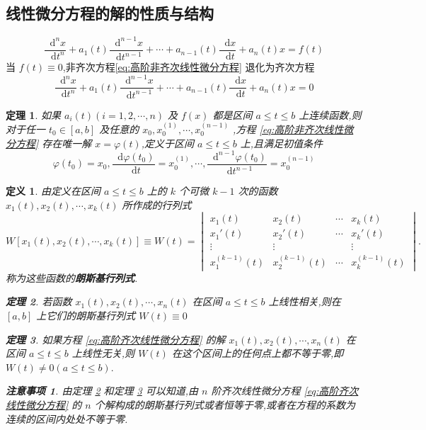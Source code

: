 \documentclass{ctexart}
\newtheorem{attention}{注意事项}
\newtheorem{definition}{定义}[section]
\newtheorem{theorem}{定理}[section]
\newcommand*{\dif}{\mathop{}\!\mathrm{d}}
\numberwithin{equation}{subsection}
\begin{document}
\subsection{线性微分方程的解的性质与结构}
\label{section:线性微分方程的解的性质与结构}
\begin{equation}
        \label{eq:高阶非齐次线性微分方程}
        \frac{\dif^nx}{\dif t^n}+a_1(t)\frac{\dif^{n-1}x}{\dif t^{n-1}}+\cdots+a_{n-1}(t)\frac{\dif x}{\dif t}+a_n(t)x=f(t)
\end{equation}
当 $f(t)\equiv0$,非齐次方程\eqref{eq:高阶非齐次线性微分方程} 退化为齐次方程
\begin{equation}
        \label{eq:高阶齐次线性微分方程}
        \frac{\dif^nx}{\dif t^n}+a_1(t)\frac{\dif^{n-1}x}{\dif t^{n-1}}+\cdots+a_{n-1}(t)\frac{\dif x}{\dif t}+a_n(t)x=0
\end{equation}
\begin{theorem}
        如果 $a_i(t)(i=1,2,\cdots,n)$ 及 $f(x)$ 都是区间 $a\leqslant t\leqslant b$ 上连续函数,则对于任一 $t_0\in[a,b]$ 及任意的 $x_0,x_0^{(1)},\cdots,x_0^{(n-1)}$ ,方程 \eqref{eq:高阶非齐次线性微分方程} 存在唯一解 $x=\varphi(t)$,定义于区间 $a\leqslant t\leqslant b$ 上,且满足初值条件
        \begin{equation}
                \label{eq:高阶齐次线性微分方程:初值条件}
                \varphi(t_0)=x_0,\frac{\dif \varphi(t_0)}{\dif t}=x_0^{(1)},\cdots,\frac{\dif^{n-1}\varphi(t_0)}{\dif t^{n-1}}=x_0^{(n-1)}
        \end{equation}
\end{theorem}
\begin{definition}
        由定义在区间 $a\leqslant t\leqslant b$ 上的 $k$ 个可微 $k-1$ 次的函数 $x_1(t),x_2(t),\cdots,x_k(t)$ 所作成的行列式
        \[W[x_1(t),x_2(t),\cdots,x_k(t)]\equiv W(t)=\begin{vmatrix}
                x_1(t)&x_2(t)&\cdots&x_k(t)\\
                x_1'(t)&x_2'(t)&\cdots&x_k'(t)\\
                \vdots&\vdots&&\vdots\\
                x_1^{(k-1)}(t)&x_2^{(k-1)}(t)&\cdots& x_k^{(k-1)}(t)
        \end{vmatrix}.\]
        称为这些函数的{\bf 朗斯基行列式}.
\begin{theorem}
        \label{theorem:朗斯基行列式1}
        若函数 $x_1(t),x_2(t),\cdots,x_n(t)$ 在区间 $a\leqslant t\leqslant b$ 上线性相关,则在 $[a,b]$ 上它们的朗斯基行列式 $W(t)\equiv 0$
\end{theorem}
\begin{theorem}
        \label{theorem:朗斯基行列式2}
        如果方程 \eqref{eq:高阶齐次线性微分方程} 的解 $x_1(t),x_2(t),\cdots,x_n(t)$ 在区间 $a\leqslant t \leqslant b$ 上线性无关,则 $W(t)$ 在这个区间上的任何点上都不等于零,即 $W(t)\ne 0(a\leqslant t\leqslant b).$
\end{theorem}
\begin{attention}
        由定理 \ref{theorem:朗斯基行列式1} 和定理 \ref{theorem:朗斯基行列式2} 可以知道,由 $n$ 阶齐次线性微分方程 \eqref{eq:高阶齐次线性微分方程} 的 $n$ 个解构成的朗斯基行列式或者恒等于零,或者在方程的系数为连续的区间内处处不等于零.
\end{attention}
\end{definition}
\end{document}
